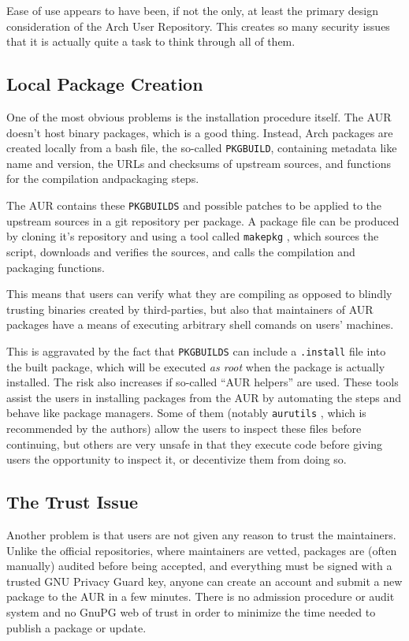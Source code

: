 Ease of use appears to have been, if not the only, at least the primary design consideration of the Arch User Repository. This creates so many security issues that it is actually quite a task to think through all of them.

\subsection*{Local Package Creation}
One of the most obvious problems is the installation procedure itself.
The AUR doesn't host binary packages, which is a good thing. Instead, Arch packages are created locally from a bash file, the so-called \texttt{PKGBUILD}, containing metadata like name and version, the URLs and checksums of upstream sources, and functions for the compilation andpackaging steps. %

The AUR contains these \texttt{PKGBUILDS} and possible patches to be applied to the upstream sources in a git repository per package.
A package file can be produced by cloning it's repository and using a tool called \texttt{makepkg} \cite{wiki:PackageCreation}, which sources the script, downloads and verifies the sources, and calls the compilation and packaging functions.

This means that users can verify what they are compiling as opposed to blindly trusting binaries created by third-parties, but also that maintainers of AUR packages have a means of executing arbitrary shell comands on users' machines.

This is aggravated by the fact that \texttt{PKGBUILDS} can include a \texttt{.install} file into the built package, which will be executed \emph{as root} when the package is actually installed.
The risk also increases if so-called \enquote{AUR helpers} are used. These tools assist the users in installing packages from the AUR by automating the steps and behave like package managers.
Some of them (notably \texttt{aurutils} \cite{gh:aurutils}, which is recommended by the authors) allow the users to inspect these files before continuing, but others are very unsafe in that they execute code before giving users the opportunity to inspect it, or decentivize them from doing so.

\subsection*{The Trust Issue}
Another problem is that users are not given any reason to trust the maintainers.
Unlike the official repositories, where maintainers are vetted, packages are (often manually) audited before being accepted, and everything must be signed with a trusted GNU Privacy Guard key, anyone can create an account and submit a new package to the AUR in a few minutes.
There is no admission procedure or audit system and no GnuPG web of trust in order to minimize the time needed to publish a package or update.

